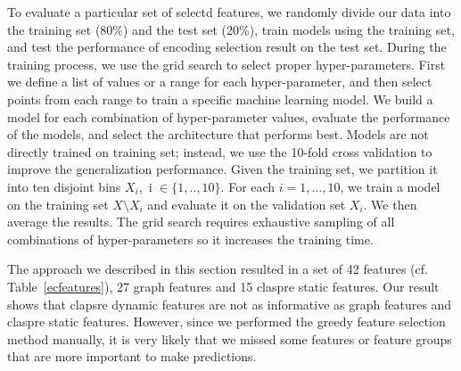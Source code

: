 \documentclass{new_tlp}
\begin{document}
To evaluate a particular set of selectd features, we randomly divide our data 
into the training set (80\%) and the test set (20\%), train models using the
training set, and test the performance of encoding selection result on the
test set. During the training process, we use the grid search to select proper 
hyper-parameters. First we define a list of values or a range for each 
hyper-parameter, and then select points from each range to train a specific
machine learning model. We build a model for each combination of
hyper-parameter values, evaluate the performance of the models, and select 
the architecture that performs best. Models are not directly trained on 
training set; instead, we use the 10-fold cross validation to improve the 
generalization performance. Given the training set, we partition it into ten 
disjoint bins $X_i$,~i $\in \{1,..,10\}$. For each $i=1,\ldots, 10$, we train
a model on the training set $X \setminus X_i$ and evaluate it on the validation 
set $X_i$. We then average the results. The grid search requires exhaustive 
sampling of all combinations of hyper-parameters so it increases the training 
time. 

The approach we described in this section resulted in a set of 42 features
(cf. Table~\ref{ecfeatures}), 27 graph features and 15 claspre static 
features. Our result shows that clapsre dynamic features are not as informative as graph features and claspre static features. However, since we performed the greedy feature selection method manually, it is very likely that we missed some features or feature groups that are more important to make predictions.
\end{document}
